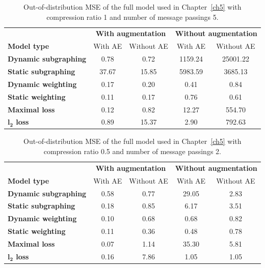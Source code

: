 \begin{appendices}
\begin{table}
\centering
\caption{Out-of-distribution MSE of the full model used in Chapter~\ref{ch5} with compression ratio 1 and number of message passings 5.}
\label{table_1_5}
\begin{tabular}{lcccc}
\toprule
 & \multicolumn{2}{c}{\textbf{With augmentation}} & \multicolumn{2}{c}{\textbf{Without augmentation}} \\
 \cmidrule{2-3} \cmidrule{4-5}
\textbf{Model type} & With AE & Without AE & With AE & Without AE \\
\midrule
\textbf{Dynamic subgraphing} & 0.78 & 0.72 & 1159.24 & 25001.22 \\
\textbf{Static subgraphing} & 37.67 & 15.85 & 5983.59 & 3685.13 \\
\textbf{Dynamic weighting} & 0.17 & 0.20 & 0.41 & 0.84 \\
\textbf{Static weighting} & 0.11 & 0.17 & 0.76 & 0.61 \\
\textbf{Maximal loss} & 0.12 & 0.82 & 12.27 & 554.70 \\
\textbf{$\boldsymbol{l_2}$ loss} & 0.89 & 15.37 & 2.90 & 792.63 \\
\bottomrule
\end{tabular}
\end{table}

\begin{table}
\centering
\caption{Out-of-distribution MSE of the full model used in Chapter~\ref{ch5} with compression ratio 0.5 and number of message passings 2.}
\label{table_0.5_2}
\begin{tabular}{lcccc}
\toprule
 & \multicolumn{2}{c}{\textbf{With augmentation}} & \multicolumn{2}{c}{\textbf{Without augmentation}} \\
 \cmidrule{2-3} \cmidrule{4-5}
\textbf{Model type} & With AE & Without AE & With AE & Without AE \\
\midrule
\textbf{Dynamic subgraphing} & 0.58 & 0.77 & 29.05 & 2.83 \\
\textbf{Static subgraphing} & 0.18 & 0.85 & 6.17 & 3.51 \\
\textbf{Dynamic weighting} & 0.10 & 0.68 & 0.68 & 0.82 \\
\textbf{Static weighting} & 0.11 & 0.36 & 0.48 & 0.78 \\
\textbf{Maximal loss} & 0.07 & 1.14 & 35.30 & 5.81 \\
\textbf{$\boldsymbol{l_2}$ loss} & 0.16 & 7.86 & 1.05 & 1.05 \\
\bottomrule
\end{tabular}
\end{table}


\end{appendices}

